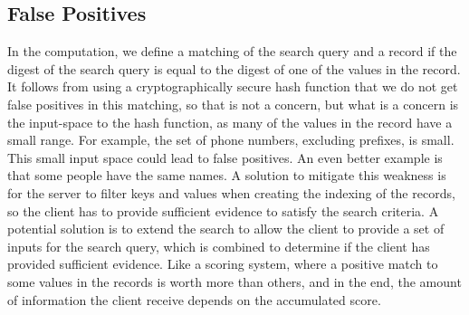 \subsection*{\thesubsection\quad False Positives}\label{subsec:False Positives}

In the computation, we define a matching of the search query and a record if the digest of the search query is equal to the digest of one of the values in the record. It follows from using a cryptographically secure hash function that we do not get false positives in this matching, so that is not a concern, but what is a concern is the input-space to the hash function, as many of the values in the record have a small range. For example, the set of phone numbers, excluding prefixes, is small. This small input space could lead to false positives. An even better example is that some people have the same names. A solution to mitigate this weakness is for the server to filter keys and values when creating the indexing of the records, so the client has to provide sufficient evidence to satisfy the search criteria. A potential solution is to extend the search to allow the client to provide a set of inputs for the search query, which is combined to determine if the client has provided sufficient evidence. Like a scoring system, where a positive match to some values in the records is worth more than others, and in the end, the amount of information the client receive depends on the accumulated score.
